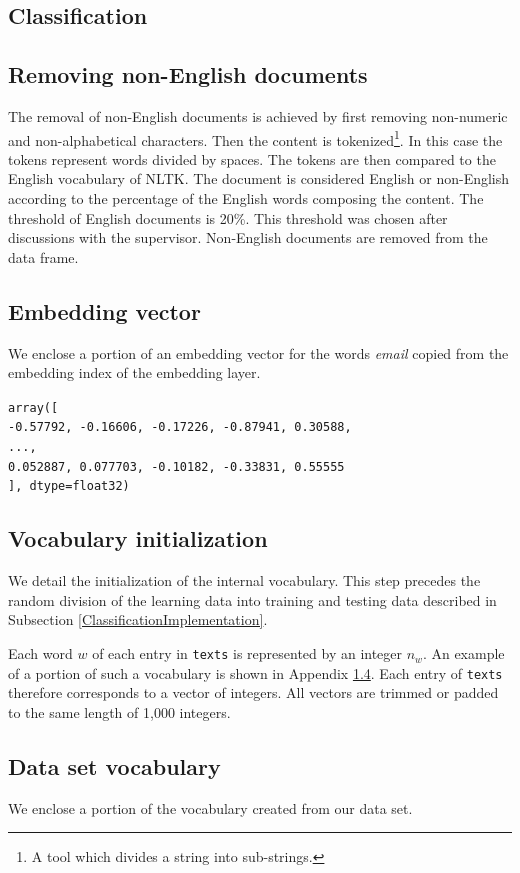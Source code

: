\begin{appendices}
\section{Classification}
\subsection{Removing non-English documents} \label{dixRemoveNonEnglish}
The removal of non-English documents is achieved by first removing non-numeric and non-alphabetical characters. Then the content is tokenized\footnote{A tool which divides a string into sub-strings.}. In this case the tokens represent words divided by spaces. The tokens are then compared to the English vocabulary of NLTK. The document is considered English or non-English according to the percentage of the English words composing the content. The threshold of English documents is 20\%. This threshold was chosen after discussions with the supervisor. Non-English documents are removed from the data frame.

\subsection{Embedding vector} \label{dix_embeddingVector}
We enclose a portion of an embedding vector for the words \textit{email} copied from the embedding index of the embedding layer.

\texttt{array([\\
 -0.57792, -0.16606, -0.17226, -0.87941,  0.30588,\\
...,\\
  0.052887, 0.077703, -0.10182, -0.33831, 0.55555\\
], dtype=float32)}

\subsection{Vocabulary initialization}
We detail the initialization of the internal vocabulary. This step precedes the random division of the learning data into training and testing data described in Subsection \ref{ClassificationImplementation}. 

Each word $w$ of each entry in \texttt{texts} is represented by an integer $n_w$. An example of a portion of such a vocabulary is shown in Appendix \ref{DSvocabulary}. Each entry of \texttt{texts} therefore corresponds to a vector of integers. All vectors are trimmed or padded to the same length of 1,000 integers. 
\subsection{Data set vocabulary} \label{DSvocabulary}
We enclose a portion of the vocabulary created from our data set.


\end{appendices}
